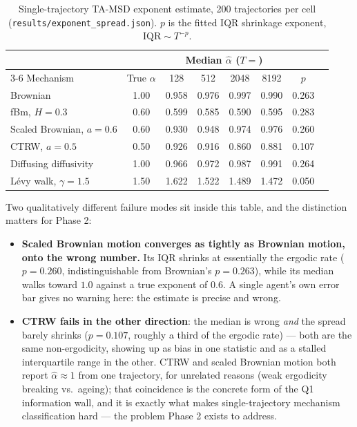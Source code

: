 \documentclass[11pt]{article}
\newcommand{\code}[1]{\texttt{#1}}
\begin{document}
\begin{table}[htbp]
\centering
\caption{Single-trajectory TA-MSD exponent estimate, 200 trajectories per
cell (\code{results/exponent\_spread.json}). $p$ is the fitted IQR shrinkage
exponent, $\mathrm{IQR}\sim T^{-p}$.}
\label{tab:phase1-exponents}
\begin{tabular}{lccccccc}
\toprule
& & \multicolumn{4}{c}{Median $\hat\alpha$ ($T=$)} & & \\
\cmidrule(lr){3-6}
Mechanism & True $\alpha$ & 128 & 512 & 2048 & 8192 & $p$ \\
\midrule
Brownian & 1.00 & 0.958 & 0.976 & 0.997 & 0.990 & 0.263 \\
fBm, $H=0.3$ & 0.60 & 0.599 & 0.585 & 0.590 & 0.595 & 0.283 \\
Scaled Brownian, $a=0.6$ & 0.60 & 0.930 & 0.948 & 0.974 & 0.976 & 0.260 \\
CTRW, $a=0.5$ & 0.50 & 0.926 & 0.916 & 0.860 & 0.881 & 0.107 \\
Diffusing diffusivity & 1.00 & 0.966 & 0.972 & 0.987 & 0.991 & 0.264 \\
L\'evy walk, $\gamma=1.5$ & 1.50 & 1.622 & 1.522 & 1.489 & 1.472 & 0.050 \\
\bottomrule
\end{tabular}
\end{table}

Two qualitatively different failure modes sit inside this table, and the
distinction matters for Phase 2:

\begin{itemize}
\item \textbf{Scaled Brownian motion converges as tightly as Brownian motion,
  onto the wrong number.} Its IQR shrinks at essentially the ergodic rate
  ($p{=}0.260$, indistinguishable from Brownian's $p{=}0.263$), while its
  median walks toward $1.0$ against a true exponent of $0.6$. A single
  agent's own error bar gives no warning here: the estimate is precise and
  wrong.
\item \textbf{CTRW fails in the other direction}: the median is wrong
  \emph{and} the spread barely shrinks ($p{=}0.107$, roughly a third of the
  ergodic rate) --- both are the same non-ergodicity, showing up as bias in
  one statistic and as a stalled interquartile range in the other. CTRW and
  scaled Brownian motion both report $\hat\alpha\approx 1$ from one
  trajectory, for unrelated reasons (weak ergodicity breaking vs.\ ageing);
  that coincidence is the concrete form of the Q1 information wall, and it is
  exactly what makes single-trajectory mechanism classification hard --- the
  problem Phase 2 exists to address.
\end{itemize}
\end{document}
